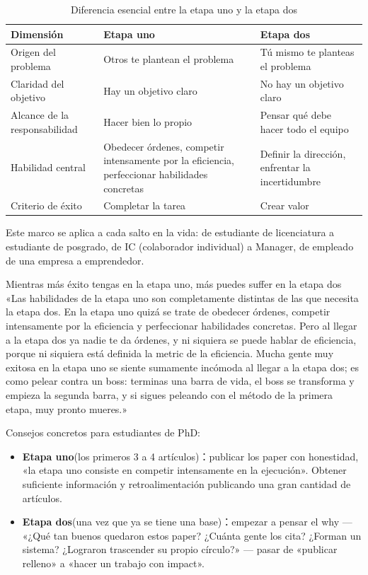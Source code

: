 \documentclass[a4paper]{article}
\begin{document}
\begin{table}[H]
\centering
\caption{Diferencia esencial entre la etapa uno y la etapa dos}
\begin{tabular}{lll}
\toprule
\textbf{Dimensión} & \textbf{Etapa uno} & \textbf{Etapa dos} \\
\midrule
Origen del problema & Otros te plantean el problema & Tú mismo te planteas el problema \\
Claridad del objetivo & Hay un objetivo claro & No hay un objetivo claro \\
Alcance de la responsabilidad & Hacer bien lo propio & Pensar qué debe hacer todo el equipo \\
Habilidad central & Obedecer órdenes, competir intensamente por la eficiencia, perfeccionar habilidades concretas & Definir la dirección, enfrentar la incertidumbre \\
Criterio de éxito & Completar la tarea & Crear valor \\
\bottomrule
\end{tabular}
\end{table}

Este marco se aplica a cada salto en la vida: de estudiante de licenciatura a estudiante de posgrado, de IC (colaborador individual) a Manager, de empleado de una empresa a emprendedor.

\begin{warningbox}{Mientras más éxito tengas en la etapa uno, más puedes suffer en la etapa dos}
«Las habilidades de la etapa uno son completamente distintas de las que necesita la etapa dos. En la etapa uno quizá se trate de obedecer órdenes, competir intensamente por la eficiencia y perfeccionar habilidades concretas. Pero al llegar a la etapa dos ya nadie te da órdenes, y ni siquiera se puede hablar de eficiencia, porque ni siquiera está definida la metric de la eficiencia. Mucha gente muy exitosa en la etapa uno se siente sumamente incómoda al llegar a la etapa dos; es como pelear contra un boss: terminas una barra de vida, el boss se transforma y empieza la segunda barra, y si sigues peleando con el método de la primera etapa, muy pronto mueres.»
\end{warningbox}

Consejos concretos para estudiantes de PhD:
\begin{itemize}
\item \textbf{Etapa uno}(los primeros 3 a 4 artículos)：publicar los paper con honestidad, «la etapa uno consiste en competir intensamente en la ejecución». Obtener suficiente información y retroalimentación publicando una gran cantidad de artículos.
\item \textbf{Etapa dos}(una vez que ya se tiene una base)：empezar a pensar el why — «¿Qué tan buenos quedaron estos paper? ¿Cuánta gente los cita? ¿Forman un sistema? ¿Lograron trascender su propio círculo?» — pasar de «publicar relleno» a «hacer un trabajo con impact».
\end{itemize}
\end{document}
